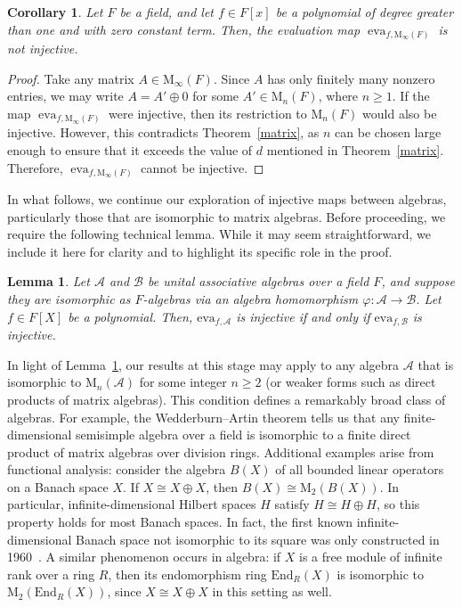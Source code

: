 \documentclass{amsart}
\newtheorem{lemma}[theorem]{Lemma}
\newtheorem{corollary}[theorem]{Corollary}
\theoremstyle{definition}
\begin{document}
	
	
	\begin{corollary}\label{finitary1}
		Let \( F \) be a field, and let \( f \in F[x] \) be a polynomial of degree greater than one and with zero constant term. Then, the evaluation map \( \operatorname{eva}_{f, \mathrm{M}_\infty(F)} \) is not injective.
	\end{corollary}
	
	\begin{proof}
		Take any matrix \( A \in \mathrm{M}_\infty(F) \). Since \( A \) has only finitely many nonzero entries, we may write \( A = A' \oplus 0 \) for some \( A' \in \mathrm{M}_n(F) \), where \( n \geq 1 \). If the map \( \operatorname{eva}_{f, \mathrm{M}_\infty(F)} \) were injective, then its restriction to \( \mathrm{M}_n(F) \) would also be injective. However, this contradicts Theorem~\ref{matrix}, as \( n \) can be chosen large enough to ensure that it exceeds the value of \( d \) mentioned in Theorem~\ref{matrix}. Therefore, \( \operatorname{eva}_{f, \mathrm{M}_\infty(F)} \) cannot be injective.
	\end{proof}
	
	In what follows, we continue our exploration of injective maps between algebras, particularly those that are isomorphic to matrix algebras. 	Before proceeding, we require the following technical lemma. While it may seem straightforward, we include it here for clarity and to highlight its specific role in the proof.
	
	\begin{lemma}\label{lem}
		Let \( \mathcal{A} \) and \( \mathcal{B} \) be unital associative algebras over a field \( F \), and suppose they are isomorphic as \( F \)-algebras via an algebra homomorphism \( \varphi: \mathcal{A} \to \mathcal{B} \). Let \( f \in F[X] \) be a polynomial.   Then,  \( \mathrm{eva}_{f,\mathcal{A}} \) is injective if and only if \( \mathrm{eva}_{f,\mathcal{B}} \) is injective.
	\end{lemma}
	
	In light of Lemma~\ref{lem}, our results at this stage may apply to any algebra \( \mathcal{A} \) that is isomorphic to \( \mathrm{M}_n(\mathcal{A}) \) for some integer \( n \geq 2 \) (or weaker forms such as direct products of matrix algebras). This condition defines a remarkably broad class of algebras. For example, the Wedderburn--Artin theorem tells us that any finite-dimensional semisimple algebra over a field is isomorphic to a finite direct product of matrix algebras over division rings. Additional examples arise from functional analysis: consider the algebra \( B(X) \) of all bounded linear operators on a Banach space \( X \). If \( X \cong X \oplus X \), then \( B(X) \cong \mathrm{M}_2(B(X)) \). In particular, infinite-dimensional Hilbert spaces \( H \) satisfy \( H \cong H \oplus H \), so this property holds for most Banach spaces. In fact, the first known infinite-dimensional Banach space not isomorphic to its square was only constructed in 1960~\cite{Pa_BP_60}. A similar phenomenon occurs in algebra: if \( X \) is a free module of infinite rank over a ring \( R \), then its endomorphism ring \( \mathrm{End}_R(X) \) is isomorphic to \( \mathrm{M}_2(\mathrm{End}_R(X)) \), since \( X \cong X \oplus X \) in this setting as well.
	
\end{document}
